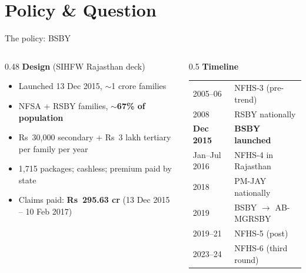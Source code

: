\documentclass[compress]{beamer}
\newcommand{\Rs}{Rs~}
\begin{document}
\section{Policy \& Question}

\begin{frame}[t]{The policy: BSBY}
\footnotesize
\begin{columns}[T]
\begin{column}{0.48\textwidth}
\textbf{Design} (SIHFW Rajasthan deck)
\begin{itemize}
\item Launched 13 Dec 2015, $\sim$1 crore families
\item NFSA + RSBY families, $\sim$\textbf{67\% of population}
\item \Rs 30,000 secondary + \Rs 3 lakh tertiary per family per year
\item 1,715 packages; cashless; premium paid by state
\item Claims paid: \textbf{\Rs 295.63 cr} (13 Dec 2015 -- 10 Feb 2017)
\end{itemize}
\end{column}
\begin{column}{0.5\textwidth}
\textbf{Timeline}\\[2pt]
\scriptsize
\begin{tabular}{@{}ll@{}}
\toprule
2005--06 & NFHS-3 (pre-trend) \\
2008 & RSBY nationally \\
\textbf{Dec 2015} & \textbf{BSBY launched} \\
Jan--Jul 2016 & NFHS-4 in Rajasthan \\
2018 & PM-JAY nationally \\
2019 & BSBY $\rightarrow$ AB-MGRSBY \\
2019--21 & NFHS-5 (post) \\
2023--24 & NFHS-6 (third round) \\
\bottomrule
\end{tabular}
\end{column}
\end{columns}
\end{frame}
\end{document}
